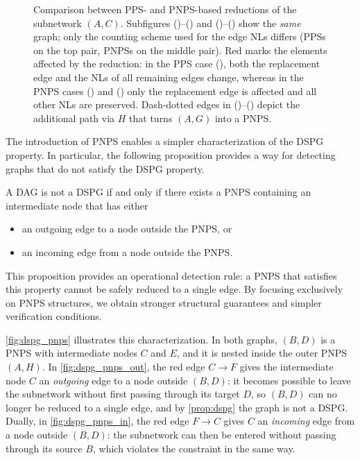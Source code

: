 \begin{figure}[]
    \caption{Comparison between \ac{PPS}- and \ac{PNPS}-based reductions of the subnetwork $(A,C)$. Subfigures ()--() and ()--() show the \emph{same} graph; only the counting scheme used for the edge \aclp{NL} differs (\acp{PPS} on the top pair, \acp{PNPS} on the middle pair). Red marks the elements affected by the reduction: in the \ac{PPS} case (), both the replacement edge and the \aclp{NL} of all remaining edges change, whereas in the \ac{PNPS} cases () and () only the replacement edge is affected and all other \aclp{NL} are preserved. Dash-dotted edges in ()--() depict the additional path via $H$ that turns $(A,G)$ into a \ac{PNPS}.}
    \label{fig:pnps}
\end{figure}


The introduction of \ac{PNPS} enables a simpler characterization of the \ac{DSPG} property. In particular, the following proposition provides a way for detecting graphs that do not satisfy the \ac{DSPG} property.
\begin{proposition}
\label{prop:dspg}
A \ac{DAG} is not a \ac{DSPG} if and only if there exists a \ac{PNPS} containing an intermediate node that has either
\begin{itemize}
    \item an outgoing edge to a node outside the \ac{PNPS}, or
    \item an incoming edge from a node outside the \ac{PNPS}.
\end{itemize}

\end{proposition}

This proposition provides an operational detection rule: a \ac{PNPS} that satisfies this property cannot be safely reduced to a single edge. By focusing exclusively on \ac{PNPS} structures, we obtain stronger structural guarantees and simpler verification conditions.

\cref{fig:dspg_pnps} illustrates this characterization. In both graphs, $(B,D)$ is a \ac{PNPS} with intermediate nodes $C$ and $E$, and it is nested inside the outer \ac{PNPS} $(A,H)$. In \cref{fig:dspg_pnps_out}, the red edge $C \to F$ gives the intermediate node $C$ an \emph{outgoing} edge to a node outside $(B,D)$: it becomes possible to leave the subnetwork without first passing through its target $D$, so $(B,D)$ can no longer be reduced to a single edge, and by \cref{prop:dspg} the graph is not a \ac{DSPG}. Dually, in \cref{fig:dspg_pnps_in}, the red edge $F \to C$ gives $C$ an \emph{incoming} edge from a node outside $(B,D)$: the subnetwork can then be entered without passing through its source $B$, which violates the constraint in the same way.

